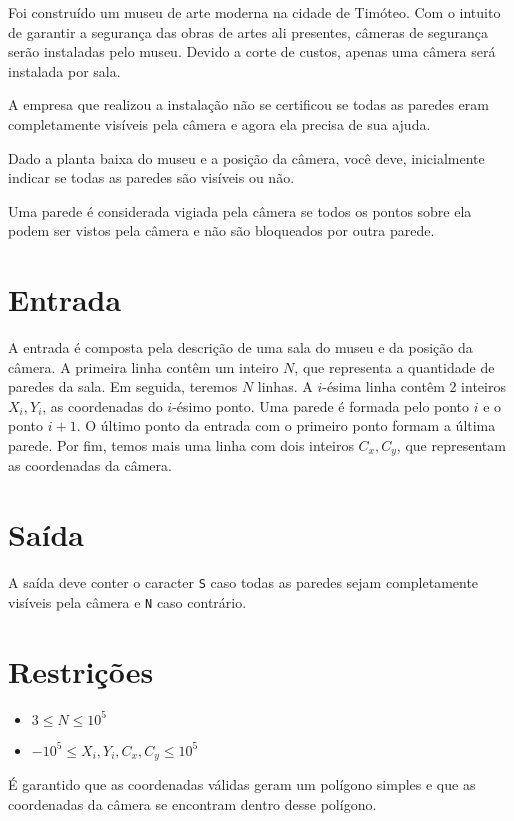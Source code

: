 Foi construído um museu de arte moderna na cidade de Timóteo.
Com o intuito de garantir a segurança das obras de artes ali presentes, câmeras de segurança serão instaladas pelo museu.
Devido a corte de custos, apenas uma câmera será instalada por sala.

A empresa que realizou a instalação não se certificou se todas as paredes eram completamente visíveis pela câmera e agora ela precisa de sua ajuda.

Dado a planta baixa do museu e a posição da câmera, você deve, inicialmente indicar se todas as paredes são visíveis ou não.


Uma parede é considerada vigiada pela câmera se todos os pontos sobre ela podem ser vistos pela câmera e não são bloqueados por outra parede.


\section*{Entrada}

A entrada é composta pela descrição de uma sala do museu e da posição da câmera.
A primeira linha contêm um inteiro $N$, que representa a quantidade de paredes da sala.
Em seguida, teremos $N$ linhas. A $i$-ésima linha contêm 2 inteiros $X_i, Y_i$, as coordenadas do $i$-ésimo ponto.
Uma parede é formada pelo ponto $i$ e o ponto $i+1$. O último ponto da entrada com o primeiro ponto formam a última parede.
Por fim, temos mais uma linha com dois inteiros $C_x, C_y$, que representam as coordenadas da câmera.

\section*{Saída}

A saída deve conter o caracter \texttt{S} caso todas as paredes sejam completamente visíveis pela câmera e \texttt{N} caso contrário.

\section*{Restrições}

\begin{itemize}
    \item $3 \leq N \leq 10^5 $
    \item $-10^5 \leq X_i, Y_i, C_x, C_y \leq 10^5 $
\end{itemize}

É garantido que as coordenadas válidas geram um polígono simples e que as coordenadas da câmera se encontram dentro desse polígono.

